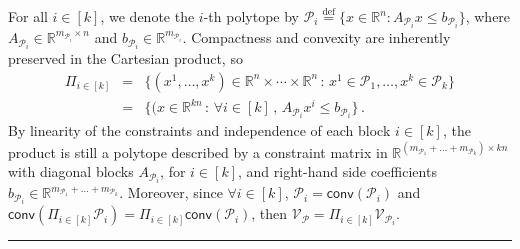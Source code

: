 \documentclass{article}
\newcommand{\R}{\mathbb{R}}
\newcommand{\jmlrBlackBox}{\rule{1.5ex}{1.5ex}}
\newcommand{\jmlrQED}{\hfill\jmlrBlackBox\par\bigskip}
\providecommand{\proofname}{Proof}
\renewenvironment{proof}%
{%
 \par\noindent{\bfseries\upshape \proofname\ }%
}%
{\jmlrQED}
\newcommand{\mP}{\mathcal{P}}
\newcommand{\mQ}{\mathcal{Q}}
\newcommand{\verts}[1]{\mathcal{V}_{#1}}
\newcommand{\conv}[1]{\mathsf{conv}\left(#1\right)}
\newcommand{\defi}{\stackrel{\mathrm{\scriptscriptstyle def}}{=}}
\begin{document}
\begin{proof}
For all $i \in [k]$, we denote the $i$-th polytope by $\mP_i \defi \{x \in \R^n : A_{\mP_i} x \le b_{\mP_i}\}$, where $A_{\mP_i} \in \R^{m_{\mP_i} \times n}$ and $b_{\mP_i} \in \R^{m_{\mP_i}}$.
Compactness and convexity are inherently preserved in the Cartesian product, so
\[
\begin{array}{rcl}
\Pi_{i \in [k]} &=& \{(x^1, \dots, x^k) \in \R^n\times\cdots \times\R^n\,:\, x^1 \in \mP_1, \dots, x^k \in \mP_k\}\\
&=& \{(x \in \R^{kn}\,:\, \forall i \in [k]\,,\, A_{\mP_i} x^i \le b_{\mP_i}\}\,.
\end{array}
\]
By linearity of the constraints and independence of each block $i \in [k]$,
the product is still a polytope described by a constraint matrix in $\R^{(m_{\mP_1}+\dots+m_{\mP_k})\times kn}$ with diagonal blocks $A_{\mP_i}$, for $i \in [k]$, and right-hand side coefficients $b_{\mP_i} \in \R^{m_{\mP_1}+\dots+m_{\mP_k}}$.
Moreover, since $\forall i \in [k]$, $\mP_i = \conv{\mP_i}$ and $\conv{\Pi_{i \in [k]}\mP_i} = \Pi_{i \in [k]}\conv{\mP_i}$, then $\verts{\mP} = \Pi_{i \in [k]}\verts{\mP_i}$.

\end{proof}
\end{document}
